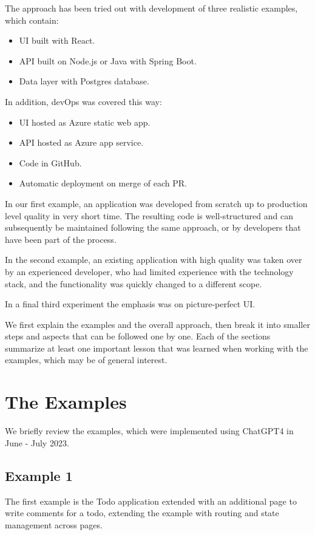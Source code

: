 \documentclass[runningheads]{llncs}
\begin{document}
The approach has been tried out with development of three realistic examples, which contain:
\begin{itemize}
    \item UI built with React.
    \item API built on Node.js or Java with Spring Boot.
    \item Data layer with Postgres database.
\end{itemize}

In addition, devOps was covered this way:
\begin{itemize}
    \item UI hosted as Azure static web app.
    \item API hosted as Azure app service.
    \item Code in GitHub.
    \item Automatic deployment on merge of each PR.
\end{itemize}

In our first example, an application was developed from scratch up to production level quality in very short time. The resulting code is well-structured and can subsequently be maintained following the same approach, or by developers that have been part of the process.

In the second example, an existing application with high quality was taken over by an experienced developer, who had limited experience with the technology stack, and the functionality was quickly changed to a different scope. 

In a final third experiment the emphasis was on picture-perfect UI.

We first explain the examples and the overall approach, then break it into smaller steps and aspects that can be followed one by one. Each of the sections summarize at least one important lesson that was learned when working with the examples, which may be of general interest.
%
\section{The Examples}
We briefly review the examples, which were implemented using ChatGPT4 in June - July 2023.

\subsection{Example 1}
The first example is the Todo application extended with an additional page to write comments for a todo, extending the example with routing and state management across pages. 
\end{document}
